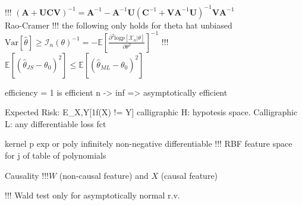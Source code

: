 !!! $(\mathbf{A} + \mathbf{U} \mathbf{C} \mathbf{V})^{-1} = \mathbf{A}^{-1} - \mathbf{A}^{-1} \mathbf{U} (\mathbf{C}^{-1} + \mathbf{V} \mathbf{A}^{-1} \mathbf{U})^{-1} \mathbf{V} \mathbf{A}^{-1}$ \\

Rao-Cramer  
!!! the following only holds for theta hat unbiased $\mathrm{Var}[\hat{\theta}]\geq \mathcal{I}_n(\theta)^{-1} = -\mathbb{E}[\frac{\partial^2 \mathrm{log}p[\mathcal{X}_n|\theta]}{\partial \theta^2}]^{-1}$
!!! $\mathbb{E} \left[ (\hat{\theta}_{JS} - \theta_0)^2 \right] \leq \mathbb{E} \left[ (\hat{\theta}_{ML} - \theta_0)^2 \right]$

efficiency = 1 is efficient
n -> inf => asymptotically efficient

Expected Risk: E_{X,Y}[1{f(X) != Y}]
calligraphic H: hypotesis space.
Calligraphic L: any differentiable loss fct 

kernel p exp or poly infinitely non-negative differentiable
!!! RBF feature space for j of table of polynomials

Causality 
!!!$W$ (non-causal feature) and $X$ (causal feature)

!!! Wald test only for asymptotically normal r.v.